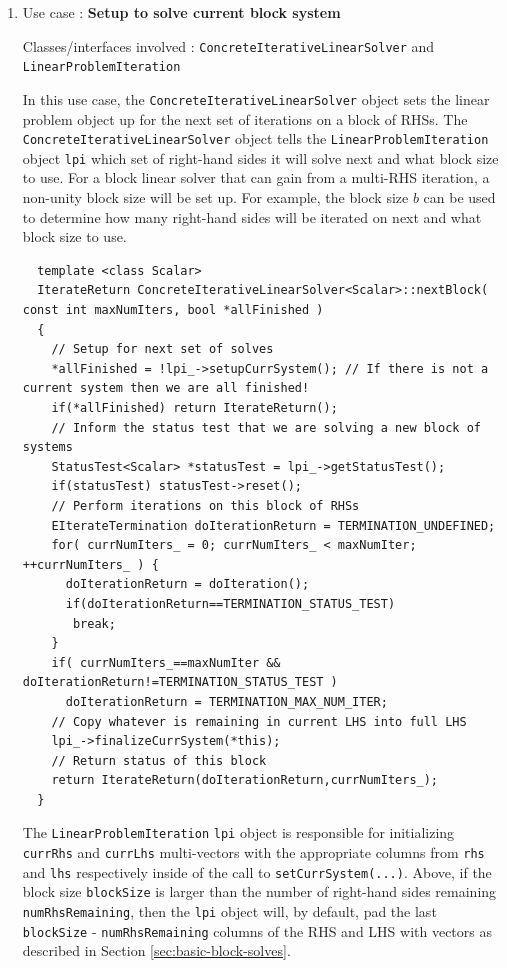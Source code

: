\documentclass[pdf,ps2pdf,11pt]{SANDreport}
\begin{document}
\begin{enumerate}

{}\item Use case : \textbf{Setup to solve current block system}

{}\noindent{}Classes/interfaces involved :
{}\texttt{Concrete\-Iterative\-Linear\-Solver} and
{}\texttt{Linear\-Problem\-Iteration}

In this use case, the {}\texttt{Concrete\-Iterative\-Linear\-Solver} object
sets the linear problem object up for the next set of iterations on a
block of RHSs.  The {}\texttt{Concrete\-Iterative\-Linear\-Solver} object
tells the {}\texttt{Linear\-Problem\-Iteration} object {}\texttt{lpi}
which set of right-hand sides it will solve next and what block size
to use.  For a block linear solver that can gain from a multi-RHS
iteration, a non-unity block size will be set up.  For example, the
block size $b$ can be used to determine how many right-hand sides will
be iterated on next and what block size to use.

{\scriptsize\begin{verbatim}
  template <class Scalar>
  IterateReturn ConcreteIterativeLinearSolver<Scalar>::nextBlock( const int maxNumIters, bool *allFinished )
  {
    // Setup for next set of solves
  	*allFinished = !lpi_->setupCurrSystem(); // If there is not a current system then we are all finished!
    if(*allFinished) return IterateReturn(); 
    // Inform the status test that we are solving a new block of systems
    StatusTest<Scalar> *statusTest = lpi_->getStatusTest();
    if(statusTest) statusTest->reset();
    // Perform iterations on this block of RHSs
    EIterateTermination doIterationReturn = TERMINATION_UNDEFINED;
    for( currNumIters_ = 0; currNumIters_ < maxNumIter; ++currNumIters_ ) {
      doIterationReturn = doIteration();
      if(doIterationReturn==TERMINATION_STATUS_TEST)
       break;
    }
    if( currNumIters_==maxNumIter && doIterationReturn!=TERMINATION_STATUS_TEST )
      doIterationReturn = TERMINATION_MAX_NUM_ITER;
    // Copy whatever is remaining in current LHS into full LHS
    lpi_->finalizeCurrSystem(*this);
    // Return status of this block
    return IterateReturn(doIterationReturn,currNumIters_);
  }
\end{verbatim}}

{}\noindent{}The {}\texttt{Linear\-Problem\-Iteration} {}\texttt{lpi}
object is responsible for initializing {}\texttt{currRhs} and
{}\texttt{currLhs} multi-vectors with the appropriate columns from
{}\texttt{rhs} and {}\texttt{lhs} respectively inside of the call to
{}\texttt{set\-Curr\-System(...)}.  Above, if the block size
{}\texttt{blockSize} is larger than the number of right-hand sides
remaining {}\texttt{num\-Rhs\-Remaining}, then the {}\texttt{lpi}
object will, by default, pad the last {}\texttt{blockSize} -
{}\texttt{num\-Rhs\-Remaining} columns of the RHS and LHS with vectors
as described in Section {}\ref{sec:basic-block-solves}.


\end{enumerate}
\end{document}
